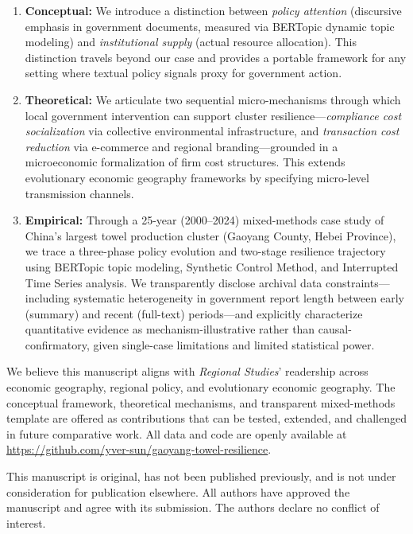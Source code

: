 \documentclass[12pt,a4paper]{article}
\begin{document}
\begin{enumerate}
    \item \textbf{Conceptual:} We introduce a distinction between \textit{policy attention} (discursive emphasis in government documents, measured via BERTopic dynamic topic modeling) and \textit{institutional supply} (actual resource allocation). This distinction travels beyond our case and provides a portable framework for any setting where textual policy signals proxy for government action.

    \item \textbf{Theoretical:} We articulate two sequential micro-mechanisms through which local government intervention can support cluster resilience---\textit{compliance cost socialization} via collective environmental infrastructure, and \textit{transaction cost reduction} via e-commerce and regional branding---grounded in a microeconomic formalization of firm cost structures. This extends evolutionary economic geography frameworks by specifying micro-level transmission channels.

    \item \textbf{Empirical:} Through a 25-year (2000--2024) mixed-methods case study of China's largest towel production cluster (Gaoyang County, Hebei Province), we trace a three-phase policy evolution and two-stage resilience trajectory using BERTopic topic modeling, Synthetic Control Method, and Interrupted Time Series analysis. We transparently disclose archival data constraints---including systematic heterogeneity in government report length between early (summary) and recent (full-text) periods---and explicitly characterize quantitative evidence as mechanism-illustrative rather than causal-confirmatory, given single-case limitations and limited statistical power.
\end{enumerate}

We believe this manuscript aligns with \textit{Regional Studies}' readership across economic geography, regional policy, and evolutionary economic geography. The conceptual framework, theoretical mechanisms, and transparent mixed-methods template are offered as contributions that can be tested, extended, and challenged in future comparative work. All data and code are openly available at \url{https://github.com/yver-sun/gaoyang-towel-resilience}.

This manuscript is original, has not been published previously, and is not under consideration for publication elsewhere. All authors have approved the manuscript and agree with its submission. The authors declare no conflict of interest.
\end{document}
